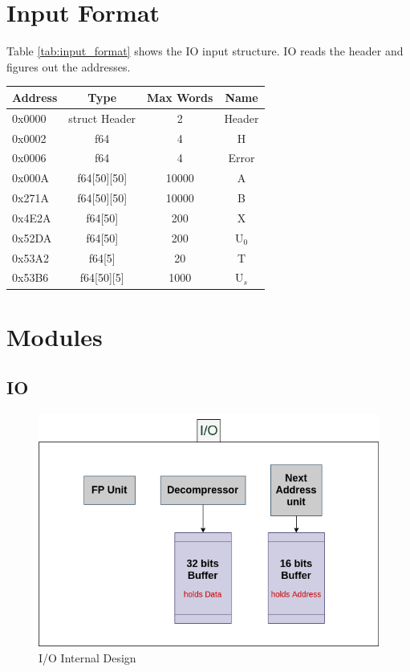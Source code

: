 \documentclass[12pt]{report}
\begin{document}
\section{Input Format}
Table \ref{tab:input_format} shows the IO input structure. IO reads the header and figures out the addresses.
\begin{center}
    \begin{tabular}{||l| c| c| c||} 
        \hline
        Address & Type & Max Words & Name  \\ [0.5ex] 
        \hline\hline
        0x0000 & struct Header & 2 & Header\\ 
        \hline
        0x0002 & f64 & 4 & H\\
        \hline
        0x0006 & f64 & 4 & Error\\
        \hline
        0x000A & f64[50][50] & 10000 & A\\
        \hline
        0x271A & f64[50][50] & 10000 & B\\
        \hline
        0x4E2A & f64[50] & 200 & X\\
        \hline
        0x52DA & f64[50] & 200 & U$_0$\\
        \hline
        0x53A2 & f64[5] & 20 & T\\
        \hline
        0x53B6 & f64[50][5] & 1000 & U$_s$\\
        \hline
       \end{tabular}
\end{center}

\section{Modules}

\subsection{IO}

\begin{figure}[hp]
    \centering
    \includegraphics[width=\textwidth]{images/IO}
    \caption{I/O Internal Design}
    \label{fig:io}
\end{figure}
\end{document}
